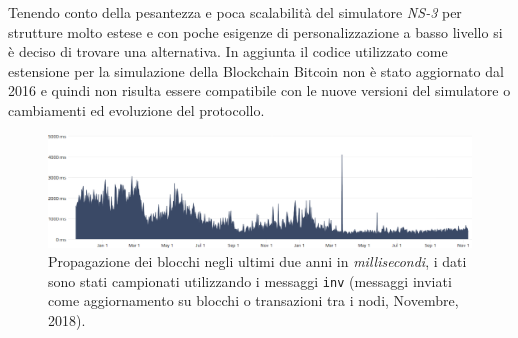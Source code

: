 Tenendo conto della pesantezza e poca scalabilità del simulatore \textit{NS-3} per strutture molto estese e con poche esigenze di personalizzazione a basso livello si è deciso di trovare una alternativa. In aggiunta il codice utilizzato come estensione per la simulazione della Blockchain Bitcoin non è stato aggiornato dal 2016 e quindi non risulta essere compatibile con le nuove versioni del simulatore o cambiamenti ed evoluzione del protocollo.\newline
\begin{figure}
    \includegraphics[width=\textwidth]{images/blocks_propagation.png}
    \caption{Propagazione dei blocchi negli ultimi due anni in \textit{millisecondi}, i dati sono stati campionati utilizzando i messaggi \texttt{inv} (messaggi inviati come aggiornamento su blocchi o transazioni tra i nodi, Novembre, 2018).}
\end{figure}


